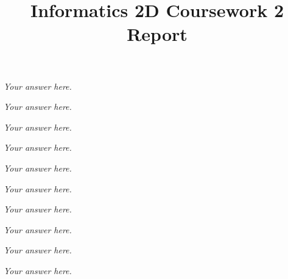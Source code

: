 \documentclass[answers]{exam}
\title{Informatics 2D Coursework 2 Report}
\author{}
\date{}
\begin{document}
\maketitle
\begin{questions}
\begin{framed}
\emph{Your answer here.}
\end{framed}
\begin{framed}
\emph{Your answer here.}
\end{framed}
\begin{framed}
\emph{Your answer here.}
\end{framed}
\begin{framed}
\emph{Your answer here.}
\end{framed}
\begin{framed}
\emph{Your answer here.}
\end{framed}
\begin{framed}
\emph{Your answer here.}
\end{framed}
\begin{framed}
\emph{Your answer here.}
\end{framed}
\begin{framed}
\emph{Your answer here.}
\end{framed}
\begin{framed}
\emph{Your answer here.}
\end{framed}
\begin{framed}
\emph{Your answer here.}
\end{framed}
\end{questions}
\end{document}
